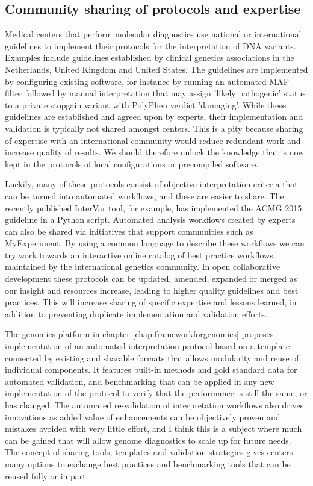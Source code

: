 \subsection{Community sharing of protocols and expertise} \label{systemsection_community}

Medical centers that perform molecular diagnostics use national or international guidelines to implement their protocols for the interpretation of DNA variants.
Examples include guidelines established by clinical genetics associations in the Netherlands\cite{ACGN}, United Kingdom\cite{Wallis_2013} and United States\cite{Richards_2015}.
The guidelines are implemented by configuring existing software, for instance by running an automated MAF filter followed by manual interpretation that may assign 'likely pathogenic' status to a private stopgain variant with PolyPhen verdict 'damaging'.
While these guidelines are established and agreed upon by experts, their implementation and validation is typically not shared amongst centers.
This is a pity because sharing of expertise with an international community would reduce redundant work and increase quality of results.
We should therefore unlock the knowledge that is now kept in the protocols of local configurations or precompiled software.

Luckily, many of these protocols consist of objective interpretation criteria that can be turned into automated workflows, and these are easier to share.
The recently published InterVar\cite{Li_2017} tool, for example, has implemented the ACMG 2015 guideline in a Python script.
Automated analysis workflows created by experts can also be shared via initiatives that support communities such as MyExperiment\cite{Goble_2010}.
By using a common language to describe these workflows we can try work towards an interactive online catalog of best practice workflows maintained by the international genetics community.
In open collaborative development these protocols can be updated, amended, expanded or merged as our insight and resources increase, leading to higher quality guidelines and best practices.
This will increase sharing of specific expertise and lessons learned, in addition to preventing duplicate implementation and validation efforts.

The genomics platform in chapter \ref{chap:frameworkforgenomics} proposes implementation of an automated interpretation protocol based on a template connected by existing and sharable formats that allows modularity and reuse of individual components.
It features built-in methods and gold standard data for automated validation, and benchmarking that can be applied in any new implementation of the protocol to verify that the performance is still the same, or has changed.
The automated re-validation of interpretation workflows also drives innovations as added value of enhancements can be objectively proven and mistakes avoided with very little effort, and I think this is a subject where much can be gained that will allow genome diagnostics to scale up for future needs.
The concept of sharing tools, templates and validation strategies gives centers many options to exchange best practices and benchmarking tools that can be reused fully or in part.

